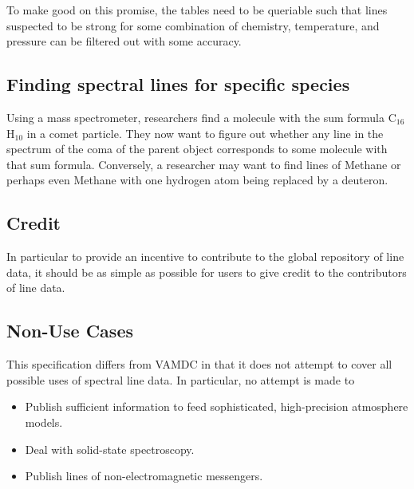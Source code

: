 \documentclass[11pt,a4paper]{ivoa}
\begin{document}
To make good on this promise, the tables need to be queriable such that
lines suspected to be strong for some combination of chemistry,
temperature, and pressure can be filtered out with some accuracy.


\subsection{Finding spectral lines for specific species}

Using a mass spectrometer, researchers find a molecule with the
sum formula C$_{16}$H$_{10}$  in a comet particle.  They now want to
figure out whether any line in the spectrum of the coma of the parent
object corresponds to some molecule with that sum formula.
Conversely, a researcher may want to find lines of Methane or perhaps
even Methane with one hydrogen atom being replaced by a deuteron.


\subsection{Credit}

In particular to provide an incentive to contribute to the global
repository of line data, it should be as simple as possible for users to
give credit to the contributors of line data.


\subsection{Non-Use Cases}

This specification differs from VAMDC in that it does not attempt to
cover all possible uses of spectral line data.  In particular, no
attempt is made to

\begin{itemize}
\item Publish sufficient information to feed sophisticated,
high-precision atmosphere models.
\item Deal with solid-state spectroscopy.
\item Publish lines of non-electromagnetic messengers.
\end{itemize}
\end{document}

